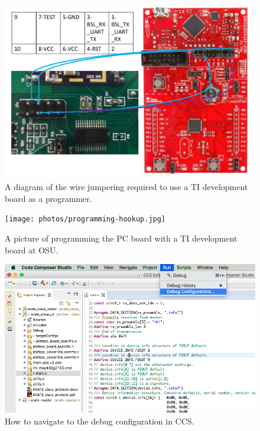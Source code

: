 \documentclass[letter,12pt]{article}
\begin{document}
\begin{figure}
\begin{centering}
\includegraphics[width=\textwidth]{photos/programming-hookup.pdf}
\par\end{centering}
\caption{A diagram of the wire jumpering required to use a TI development board
as a programmer.}
\label{programming-hookup-1}
\end{figure}

\begin{figure}
\begin{centering}
\texttt{[image: photos/programming-hookup.jpg]}
\par\end{centering}
\caption{A picture of programming the PC board with a TI development board
at OSU.}
\label{programming-hookup-2}
\end{figure}

\begin{figure}
\begin{centering}
\includegraphics[width=.75\textwidth]{photos/ccs-setup-1.png}
\par\end{centering}
\caption{How to navigate to the debug configuration in CCS.}
\label{CCS-change-1}
\end{figure}
\end{document}
